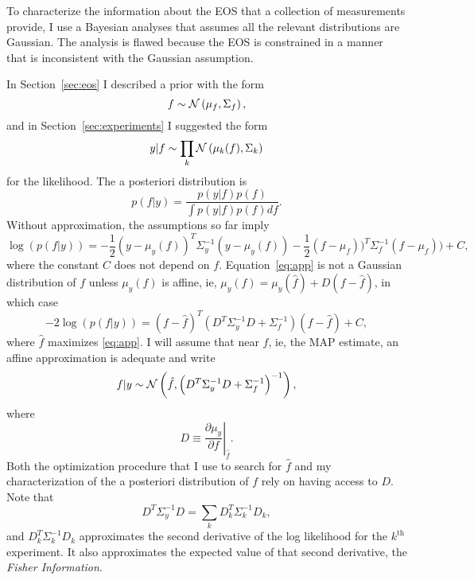 \documentclass[11pt]{article}
\newcommand{\normal}[2]{{\cal N}\left( #1,#2 \right)}
\newcommand{\normalexp}[3]{ -\frac{1}{2}
      (#1 - #2)^T #3^{-1} (#1 - #2) }
\newcommand{\eos}{f}
\newcommand{\data}{y}
\begin{document}
To characterize the information about the EOS that a collection of
measurements provide, I use a Bayesian analyses that assumes all the
relevant distributions are Gaussian.  The analysis is flawed because
the EOS is constrained in a manner that is inconsistent with the
Gaussian assumption.

In Section~\ref{sec:eos} I described a prior with the form
\begin{equation*}
  \eos \sim \normal{\mu_\eos}{\Sigma_\eos},
\end{equation*}
and in Section~\ref{sec:experiments} I suggested the form
\begin{equation*}
  \data | \eos \sim \prod_k \normal{\mu_k(f)}{\Sigma_k}
\end{equation*}
for the likelihood.  The a posteriori distribution is
\begin{equation*}
  p(\eos|\data) = \frac{p(\data|\eos) p(\eos)}{\int p(\data|\eos)
    p(\eos) d \eos}.
\end{equation*}
Without approximation, the assumptions so far imply
\begin{equation}
  \label{eq:app}
  \log(p(\eos|\data)) = \normalexp{\data}{\mu_\data(\eos)}{\Sigma_\data}
\normalexp{\eos}{\mu_\eos)}{\Sigma_\eos} + C,
\end{equation}
where the constant $C$ does not depend on $f$.
Equation~\eqref{eq:app} is not a Gaussian distribution of $\eos$
unless $\mu_\data(\eos)$ is affine, ie,
$\mu_\data(\eos) = \mu_\data(\hat \eos) + D(\eos - \hat \eos)$, in
which case
\begin{equation*}
  -2\log(p(\eos|\data)) = \left(\eos - \hat \eos \right)^T
  \left( D^T \Sigma_\data^{-1} D + \Sigma_\eos^{-1} \right)
  \left(\eos - \hat \eos \right) + C,
\end{equation*}
where $\hat \eos$ maximizes \eqref{eq:app}.  I will assume that near
$\hat \eos$, ie, the MAP estimate, an affine approximation is adequate
and write
\begin{equation}
  \label{eq:normal_app}
  \eos|\data \sim \normal{\hat \eos}{\left( D^T \Sigma_\data^{-1} D + \Sigma_\eos^{-1} \right)^{-1}},
\end{equation}
where
\begin{equation*}
  D \equiv \left. \frac{\partial\mu_\data}{\partial \eos}
  \right|_{\hat \eos} .
\end{equation*}
Both the optimization procedure that I use to search for $\hat \eos$
and my characterization of the a posteriori distribution of $\eos$
rely on having access to $D$.  Note that
\begin{equation}
  \label{eq:Fisher_I}
   D^T \Sigma_\data^{-1} D = \sum_k D_k^T \Sigma_k^{-1} D_k,
\end{equation}
and $D_k^T \Sigma_k^{-1} D_k$ approximates the second derivative of
the log likelihood for the $k^{\text{th}}$ experiment.  It also
approximates the expected value of that second derivative, the
\emph{Fisher Information}.
\end{document}
